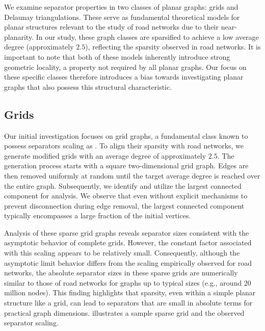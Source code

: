We examine separator properties in two classes of planar graphs: grids and Delaunay triangulations.
These serve as fundamental theoretical models for planar structures relevant to the study of road networks due to their near-planarity.
In our study, these graph classes are sparsified to achieve a low average degree (approximately \(2.5\)), reflecting the sparsity observed in road networks.
It is important to note that both of these models inherently introduce strong geometric locality, a property not required by all planar graphs.
Our focus on these specific classes therefore introduces a bias towards investigating planar graphs that also possess this structural characteristic.

\subsection{Grids}
\label{sec:synthetic:grid}

Our initial investigation focuses on grid graphs, a fundamental class known to possess separators scaling as .
To align their sparsity with road networks, we generate modified grids with an average degree of approximately \(2.5\).
The generation process starts with a square two-dimensional grid graph.
Edges are then removed uniformly at random until the target average degree is reached over the entire graph.
Subsequently, we identify and utilize the largest connected component for analysis.
We observe that even without explicit mechanisms to prevent disconnection during edge removal, the largest connected component typically encompasses a large fraction of the initial vertices.

Analysis of these sparse grid graphs reveals separator sizes consistent with the  asymptotic behavior of complete grids.
However, the constant factor associated with this scaling appears to be relatively small.
Consequently, although the asymptotic limit behavior differs from the  scaling empirically observed for road networks, the absolute separator sizes in these sparse grids are numerically similar to those of road networks for graphs up to typical sizes (e.g., around 20 million nodes).
This finding highlights that sparsity, even within a simple planar structure like a grid, can lead to separators that are small in absolute terms for practical graph dimensions.
 illustrates a sample sparse grid and the observed separator scaling.

